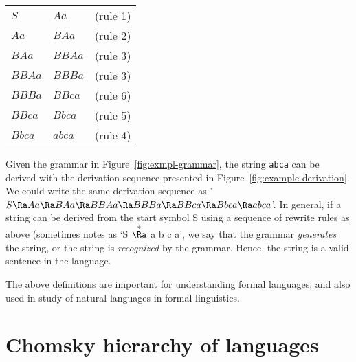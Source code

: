 \begin{marginfigure}
  \begin{tcolorbox}[halign=center]
    \begin{tabular}{l@{\Ra}ll}
      $S      $ & $A a$     &(rule 1)\\
      $A a    $ & $B A a$   &(rule 2)\\
      $B A a  $ & $B B A a$ &(rule 3)\\
      $B B A a$ & $B B B a$ &(rule 3)\\
      $B B B a$ & $B B c a$ &(rule 6)\\
      $B B c a$ & $B b c a$ &(rule 5)\\
      $B b c a$ & $a b c a$ &(rule 4)\\
    \end{tabular}
  \end{tcolorbox}
  \caption{\label{fig:example-derivation}%
    A derivation of string $abca$ using the grammar
    in Figure~\ref{fig:exmpl-grammar}.
  }
\end{marginfigure}
Given the grammar in Figure~\ref{fig:exmpl-grammar},
the string \texttt{abca} can be derived with the derivation sequence
presented in Figure~\ref{fig:example-derivation}.
We could write the same derivation sequence as
'$S \Ra A a \Ra B A a \Ra B B A a \Ra B B B a \Ra B B c a \Ra B b c a \Ra a b c a$'.
In general, if a string can be derived from the start symbol S
using a sequence of rewrite rules as above
(sometimes notes as `S $\overset{*}{\Ra}$ a b c a',
we say that the grammar \emph{generates} the string,
or the string is \emph{recognized} by the grammar.
Hence, the string is a valid sentence in the language.

The above definitions are important for understanding formal languages,
and also used in study of natural languages in formal linguistics.

\section{Chomsky hierarchy of languages}

\begin{marginfigure}
  \begin{center}
    \tikzset{external/export next=false}%
  \end{center}
  \caption{\label{fig:chomsky-h}%
    Chomsky hierarchy of language classes. 
    The classes are also known as \emph{type-0}
    (recursively enumerable) to \emph{type-3} (regular).
  }
\end{marginfigure}

